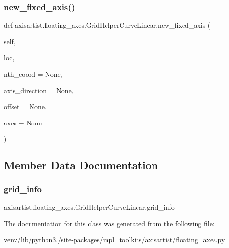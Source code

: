 \subsubsection{\texorpdfstring{new\+\_\+fixed\+\_\+axis()}{new\_fixed\_axis()}}
{\footnotesize\ttfamily def axisartist.\+floating\+\_\+axes.\+Grid\+Helper\+Curve\+Linear.\+new\+\_\+fixed\+\_\+axis (\begin{DoxyParamCaption}\item[{}]{self,  }\item[{}]{loc,  }\item[{}]{nth\+\_\+coord = {\ttfamily None},  }\item[{}]{axis\+\_\+direction = {\ttfamily None},  }\item[{}]{offset = {\ttfamily None},  }\item[{}]{axes = {\ttfamily None} }\end{DoxyParamCaption})}



\subsection{Member Data Documentation}
\mbox{\label{classaxisartist_1_1floating__axes_1_1GridHelperCurveLinear_ada8bfac70ca5fbab6887add4c234c5e3}} 
\subsubsection{\texorpdfstring{grid\+\_\+info}{grid\_info}}
{\footnotesize\ttfamily axisartist.\+floating\+\_\+axes.\+Grid\+Helper\+Curve\+Linear.\+grid\+\_\+info}



The documentation for this class was generated from the following file\+:\begin{DoxyCompactItemize}
\item 
venv/lib/python3./site-\/packages/mpl\+\_\+toolkits/axisartist/\hyperlink{axisartist_2floating__axes_8py}{floating\+\_\+axes.\+py}\end{DoxyCompactItemize}
